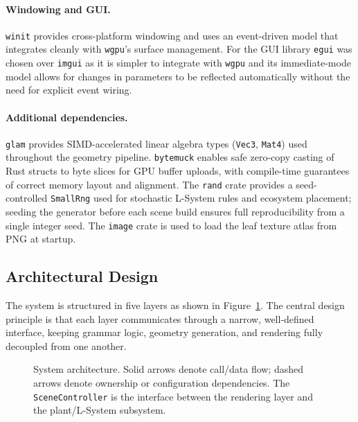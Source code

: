 \paragraph{Windowing and GUI.}
\texttt{winit} provides cross-platform windowing and uses an event-driven model that integrates cleanly with
\texttt{wgpu}'s surface management. For the GUI library \texttt{egui} was chosen over \texttt{imgui} as it is
simpler to integrate with \texttt{wgpu} and its immediate-mode model allows for changes in parameters to be
reflected automatically without the need for explicit event wiring.

\paragraph{Additional dependencies.}
\texttt{glam} provides SIMD-accelerated linear algebra types (\texttt{Vec3}, \texttt{Mat4}) used throughout
the geometry pipeline. \texttt{bytemuck} enables safe zero-copy casting of Rust structs to byte slices for
GPU buffer uploads, with compile-time guarantees of correct memory layout and alignment. The \texttt{rand}
crate provides a seed-controlled \texttt{SmallRng} used for stochastic L-System rules and ecosystem
placement; seeding the generator before each scene build ensures full reproducibility from a single integer
seed. The \texttt{image} crate is used to load the leaf texture atlas from PNG at startup.

\subsection{Architectural Design}
\label{sec:architecture}

The system is structured in five layers as shown in Figure~\ref{fig:arch}. The central design principle is
that each layer communicates through a narrow, well-defined interface, keeping grammar logic, geometry
generation, and rendering fully decoupled from one another.

\begin{figure}[h]
  \centering
  \resizebox{\textwidth}{!}{}
  \caption{System architecture. Solid arrows denote call/data flow; dashed arrows denote ownership or
    configuration dependencies. The \texttt{SceneController} is the interface between the rendering layer
  and the plant/L-System subsystem.}
  \label{fig:arch}
\end{figure}

